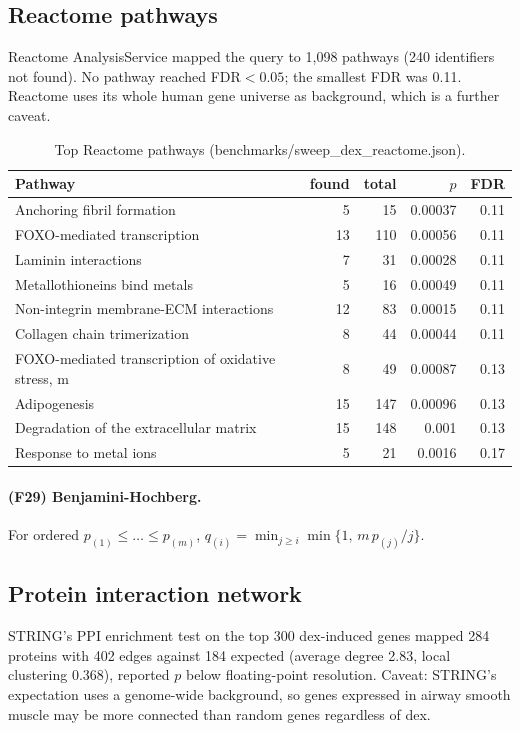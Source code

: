 \subsection{Reactome pathways}
Reactome AnalysisService mapped the query to 1,098 pathways (240 identifiers not found). No pathway reached FDR$<0.05$; the smallest FDR was 0.11. Reactome uses its whole human gene universe as background, which is a further caveat.
\begin{table}[h]\centering\small\begin{tabular}{lrrrr}\hline Pathway & found & total & $p$ & FDR\\\hline
Anchoring fibril formation & 5 & 15 & 0.00037 & 0.11\\
FOXO-mediated transcription & 13 & 110 & 0.00056 & 0.11\\
Laminin interactions & 7 & 31 & 0.00028 & 0.11\\
Metallothioneins bind metals & 5 & 16 & 0.00049 & 0.11\\
Non-integrin membrane-ECM interactions & 12 & 83 & 0.00015 & 0.11\\
Collagen chain trimerization & 8 & 44 & 0.00044 & 0.11\\
FOXO-mediated transcription of oxidative stress, m & 8 & 49 & 0.00087 & 0.13\\
Adipogenesis & 15 & 147 & 0.00096 & 0.13\\
Degradation of the extracellular matrix & 15 & 148 & 0.001 & 0.13\\
Response to metal ions & 5 & 21 & 0.0016 & 0.17\\
\hline\end{tabular}\caption{Top Reactome pathways (benchmarks/sweep\_dex\_reactome.json).}\end{table}
\paragraph{(F29) Benjamini-Hochberg.} For ordered $p_{(1)}\le\dots\le p_{(m)}$, $q_{(i)}=\min_{j\ge i}\min\{1,\,m\,p_{(j)}/j\}$.
\subsection{Protein interaction network}
STRING's PPI enrichment test on the top 300 dex-induced genes mapped 284 proteins with 402 edges against 184 expected (average degree 2.83, local clustering 0.368), reported $p$ below floating-point resolution. Caveat: STRING's expectation uses a genome-wide background, so genes expressed in airway smooth muscle may be more connected than random genes regardless of dex.

